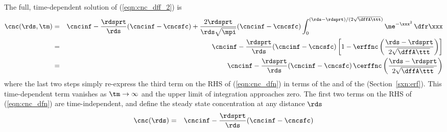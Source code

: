\documentclass[12pt,twoside]{book}
\begin{document}
The full, time-dependent solution of (\ref{eqn:cnc_dff_2}) is
\begin{eqnarray}
\label{eqn:cnc_dfn}
\cnc(\rds,\tm) & = & 
\cncinf - \frac{\rdsprt}{\rds } ( \cncinf - \cncsfc ) +
\frac{2 \rdsprt}{\rds \sqrt{ \mpi } } ( \cncinf - \cncsfc ) 
\int_{0}^{ (\rds - \rdsprt ) / ( 2 \sqrt { \dffA \ttt } ) }
\me^{ - \xxx^{2} } \,\dfr\xxx \\
& = & 
\cncinf - \frac{\rdsprt}{\rds } ( \cncinf - \cncsfc )
\left[ 1 - \erffnc \left( \frac{\rds - \rdsprt}{2 \sqrt { \dffA
\ttt } } \right) \right] \nonumber \\
\label{eqn:cnc_cerf_dfn}
& = & 
\cncinf - \frac{\rdsprt}{\rds } ( \cncinf - \cncsfc ) \,
\cerffnc \left( \frac{\rds - \rdsprt}{2 \sqrt { \dffA \ttt } } \right)
\end{eqnarray}
where the last two steps simply re-express the third term on the RHS
of (\ref{eqn:cnc_dfn}) in terms of the  and of
the  (Section~\ref{sxn:erf}).
This time-dependent term vanishes as $\tm \rightarrow \infty$ and the
upper limit of integration approaches zero. 
The first two terms on the RHS of (\ref{eqn:cnc_dfn}) are
time-independent, and define the steady state concentration at any
distance $\rds$
\begin{eqnarray}
\cnc(\rds) & = & 
\cncinf - \frac{\rdsprt}{\rds } ( \cncinf - \cncsfc )
\label{eqn:cnc_ss_dfn}
\end{eqnarray}
\end{document}
